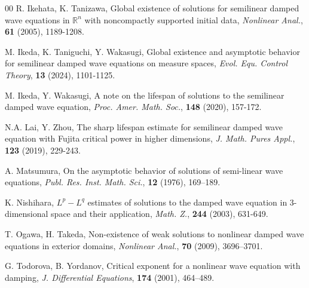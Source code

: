 \documentclass[a4paper,11pt]{article} %
\theoremstyle{remark}
\theoremstyle{definition}
\numberwithin{equation}{section}
\begin{document}
\begin{thebibliography}{00}
 R. Ikehata, K. Tanizawa, Global existence of solutions for semilinear damped wave equations in $\mathbb{R}^n$ with noncompactly supported initial data, \textit{Nonlinear Anal.}, \textbf{61} (2005), 1189-1208.

 M. Ikeda, K. Taniguchi, Y. Wakasugi, Global existence and asymptotic behavior for semilinear damped wave equations on measure spaces, \textit{Evol. Equ. Control Theory}, \textbf{13} (2024), 1101-1125.

 M. Ikeda, Y. Wakasugi, A note on the lifespan of solutions to the semilinear damped wave equation, \textit{Proc. Amer. Math. Soc.}, \textbf{148} (2020), 157-172.

 N.A. Lai, Y. Zhou, The sharp lifespan estimate for semilinear damped wave equation with Fujita critical power in higher dimensions, \textit{J. Math. Pures Appl.}, \textbf{123} (2019), 229-243.

 A. Matsumura, On the asymptotic behavior of solutions of semi-linear wave equations, \textit{Publ. Res. Inst. Math. Sci.}, \textbf{12} (1976), 169–189.

 K. Nishihara, $L^p-L^q$ estimates of solutions to the damped wave equation in 3-dimensional space and their application, \textit{Math. Z.}, \textbf{244} (2003), 631-649.

 T. Ogawa, H. Takeda, Non-existence of weak solutions to nonlinear damped wave equations in exterior domains, \textit{Nonlinear Anal.}, \textbf{70} (2009), 3696–3701.

 G. Todorova, B. Yordanov, Critical exponent for a nonlinear wave equation with damping, \textit{J. Differential Equations}, \textbf{174} (2001), 464–489.

\end{thebibliography}
\end{document}
